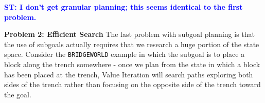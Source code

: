 \documentclass[]{article}
\newcommand{\stnote}[1]{\textcolor{Blue}{\textbf{ST: #1}}}
\begin{document}
\stnote{I don't get granular planning; this seems identical to the
  first problem.}




{\bf Problem 2: Efficient Search} The last problem with subgoal
planning is that the use of subgoals actually requires that we
research a huge portion of the state space. Consider the
\texttt{BRIDGEWORLD} example in which the subgoal is to place a block
along the trench somewhere - once we plan from the state in which a
block has been placed at the trench, Value Iteration will search paths
exploring both sides of the trench rather than focusing on the
opposite side of the trench toward the goal.
\end{document}
